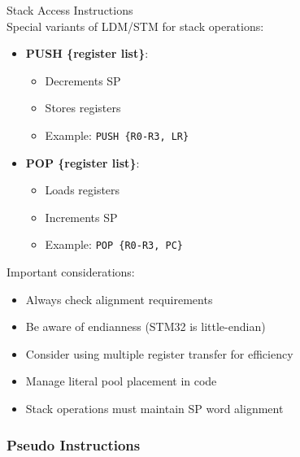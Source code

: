 \begin{concept}{Stack Access Instructions}\\
Special variants of LDM/STM for stack operations:
\begin{itemize}
  \item \textbf{PUSH \{register list\}}:
    \begin{itemize}
      \item Decrements SP
      \item Stores registers
      \item Example: \texttt{PUSH \{R0-R3, LR\}}
    \end{itemize}
  \item \textbf{POP \{register list\}}:
    \begin{itemize}
      \item Loads registers
      \item Increments SP
      \item Example: \texttt{POP \{R0-R3, PC\}}
    \end{itemize}
\end{itemize}
\end{concept}

\begin{remark}
Important considerations:
\begin{itemize}
  \item Always check alignment requirements
  \item Be aware of endianness (STM32 is little-endian)
  \item Consider using multiple register transfer for efficiency
  \item Manage literal pool placement in code
  \item Stack operations must maintain SP word alignment
\end{itemize}
\end{remark}

\subsubsection{Pseudo Instructions}

